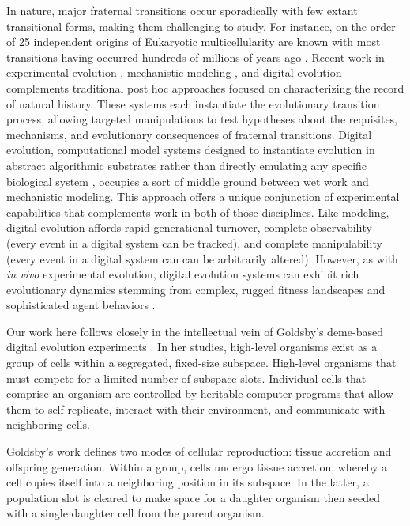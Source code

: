 In nature, major fraternal transitions occur sporadically with few extant transitional forms, making them challenging to study.
For instance, on the order of 25 independent origins of Eukaryotic multicellularity are known \citep{grosberg2007evolution} with most transitions having occurred hundreds of millions of years ago \citep{libby2014ratcheting}.
Recent work in experimental evolution \citep{ratcliff2014experimental, ratcliff2015origins, gulli2019evolution, koschwanez2013improved}, mechanistic modeling \citep{hanschen2015evolutionary, staps2019emergence}, and digital evolution \citep{goldsby2012task, goldsby2014evolutionary} complements traditional post hoc approaches focused on characterizing the record of natural history.
These systems each instantiate the evolutionary transition process, allowing targeted manipulations to test hypotheses about the requisites, mechanisms, and evolutionary consequences of fraternal transitions.
Digital evolution, computational model systems designed to instantiate evolution in abstract algorithmic substrates rather than directly emulating any specific biological system \citep{wilke2002biology}, occupies a sort of middle ground between wet work and mechanistic modeling.
This approach offers a unique conjunction of experimental capabilities that complements work in both of those disciplines.
Like modeling, digital evolution affords rapid generational turnover, complete observability (every event in a digital system can be tracked), and complete manipulability (every event in a digital system can can be arbitrarily altered).
However, as with \textit{in vivo} experimental evolution, digital evolution systems can exhibit rich evolutionary dynamics stemming from complex, rugged fitness landscapes \citep{labar2017evolution} and sophisticated agent behaviors \citep{grabowski2013case}.

Our work here follows closely in the intellectual vein of Goldsby's deme-based digital evolution experiments \citep{goldsby2012task, goldsby2014evolutionary}.
In her studies, high-level organisms exist as a group of cells within a segregated, fixed-size subspace.
High-level organisms that must compete for a limited number of subspace slots.
Individual cells that comprise an organism are controlled by heritable computer programs that allow them to self-replicate, interact with their environment, and communicate with neighboring cells.

Goldsby's work defines two modes of cellular reproduction: tissue accretion and offspring generation.
Within a group, cells undergo tissue accretion, whereby a cell copies itself into a neighboring position in its subspace.
In the latter, a population slot is cleared to make space for a daughter organism then seeded with a single daughter cell from the parent organism.

